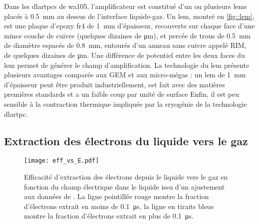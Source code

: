       Dans les \glspl{dlartpc} de \gls{wa105}, l'amplificateur est constitué d'un ou plusieurs \glspl{lem} placés à \SI{0.5}{\milli\meter} au dessus de l'interface liquide-gaz. Un \gls{lem}, montré en \autoref{fig::lem}, est une plaque d'epoxy \gls{fr4} de \SI{1}{\milli\meter} d'épaisseur, recouverte sur chaque face d'une mince couche de cuivre (quelques dizaines de \si{\micro\meter}), et percée de trous de \SI{0.5}{\milli\meter} de diamètre espacés de \SI{0.8}{\milli\meter}, entourés d'un anneau sans cuivre appelé RIM, de quelques dizaines de \si{\micro\meter}. Une différence de potentiel entre les deux faces du \gls{lem} permet de générer le champ d'amplification. La technologie du \gls{lem} présente plusieurs avantages comparée aux GEM et aux micro-mégas : un \gls{lem} de \SI{1}{\milli\meter} d'épaisseur peut être produit industriellement, est fait avec des matières premières standards et a un faible coup par unité de surface Enfin, il est peu sensible à la contraction thermique impliquée par la cryogénie de la technologie \gls{dlartpc}.

    \subsection{Extraction des électrons du liquide vers le gaz}\label{sec::extraction}

      \begin{figure}[htbp]
        \centering
        \texttt{[image: eff\_vs\_E.pdf]}
        \caption[Efficacité d'extraction des électrons depuis le liquide vers le gaz en fonction du champ électrique.]{\label{fig::guschin}Efficacité d'extraction des électrons depuis le liquide vers le gaz en fonction du champ électrique dans le liquide issu d'un ajustement aux données de \cite{guschin}. La ligne pointillée rouge montre la fraction d'électrons extrait en moins de \SI{0.1}{\micro\second}, la ligne en tiraits bleus montre la fraction d'électrons extrait en plus de \SI{0.1}{\micro\second}.}
      \end{figure}

